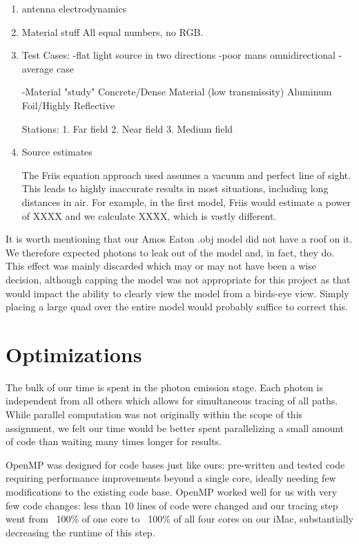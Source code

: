 \documentclass[%
        final,
        notitlepage,
        narroweqnarray,
        inline,
        twoside,
        ]{ieee}
\begin{document}
\begin{enumerate}

\item antenna electrodynamics

\item Material stuff
All equal numbers, no RGB.

\item Test Cases:
-flat light source in two directions
-poor mans omnidirectional
-average case 

-Material "study"
Concrete/Dense Material (low transmissity)
Aluminum Foil/Highly Reflective

Stations:
1. Far field
2. Near field
3. Medium field

\item Source estimates

The Friis equation approach used assumes a vacuum and perfect line of sight.
This leads to highly inaccurate results in most situations, including long
distances in air. For example, in the first model, Friis would estimate a power of XXXX
and we calculate XXXX, which is vastly different. 

\end{enumerate}

It is worth mentioning that our Amos Eaton .obj model did not have a roof on it.
We therefore expected photons to leak out of the model and, in fact, they do.
This effect was mainly discarded which may or may not have been a wise
decision, although capping the model was not appropriate for this project as
that would impact the ability to clearly view the model from a birds-eye view.
Simply placing a large quad over the entire model would probably suffice to
correct this.

\section{Optimizations}
The bulk of our time is spent in the photon emission stage.  Each photon is
independent from all others which allows for simultaneous tracing of all
paths.  While parallel computation was not originally within the scope of this
assignment, we felt our time would be better spent parallelizing a small amount
of code than waiting many times longer for results.

OpenMP \cite{Grama} was designed for code bases just like ours: pre-written and
tested code requiring performance improvements beyond a single core, ideally
needing few modifications to the existing code base.  OpenMP worked well for
us with very few code changes: less than 10 lines of code were changed and
our tracing step went from ~100\% of one core to ~100\% of all four cores on
our iMac, substantially decreasing the runtime of this step.
\end{document}
